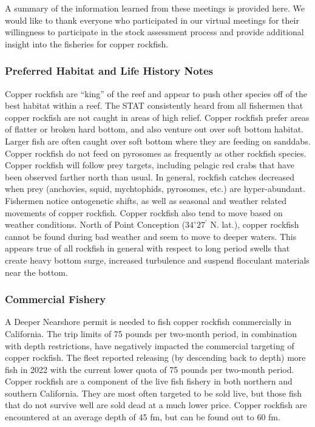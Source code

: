 \documentclass[11pt,
  english,
  letterpaper,
]{article}
\begin{document}
A summary of the information learned from these meetings is provided here. We would like to thank everyone who participated in our virtual meetings for their willingness to participate in the stock assessment process and provide additional insight into the fisheries for copper rockfish.

\hypertarget{preferred-habitat-and-life-history-notes}{%
\subsubsection{Preferred Habitat and Life History Notes}\label{preferred-habitat-and-life-history-notes}}

Copper rockfish are ``king'' of the reef and appear to push other species off of the best habitat within a reef. The STAT consistently heard from all fishermen that copper rockfish are not caught in areas of high relief. Copper rockfish prefer areas of flatter or broken hard bottom, and also venture out over soft bottom habitat. Larger fish are often caught over soft bottom where they are feeding on sanddabs. Copper rockfish do not feed on pyrosomes as frequently as other rockfish species. Copper rockfish will follow prey targets, including pelagic red crabs that have been observed farther north than usual. In general, rockfish catches decreased when prey (anchovies, squid, mychtophids, pyrosomes, etc.) are hyper-abundant. Fishermen notice ontogenetic shifts, as well as seasonal and weather related movements of copper rockfish. Copper rockfish also tend to move based on weather conditions. North of Point Conception ($34^\circ 27^\prime$ N. lat.), copper rockfish cannot be found during bad weather and seem to move to deeper waters. This appears true of all rockfish in general with respect to long period swells that create heavy bottom surge, increased turbulence and suspend flocculant materials near the bottom.

\hypertarget{commercial-fishery-1}{%
\subsubsection{Commercial Fishery}\label{commercial-fishery-1}}

A Deeper Nearshore permit is needed to fish copper rockfish commercially in California. The trip limits of 75 pounds per two-month period, in combination with depth restrictions, have negatively impacted the commercial targeting of copper rockfish. The fleet reported releasing (by descending back to depth) more fish in 2022 with the current lower quota of 75 pounds per two-month period. Copper rockfish are a component of the live fish fishery in both northern and southern California. They are most often targeted to be sold live, but those fish that do not survive well are sold dead at a much lower price. Copper rockfish are encountered at an average depth of 45 fm, but can be found out to 60 fm.
\end{document}
